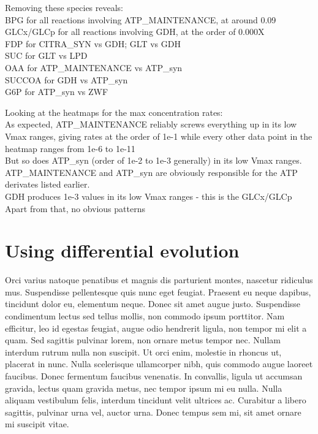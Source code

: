 \documentclass[parskip=full]{scrreprt}
\begin{document}
Removing these species reveals:\\
BPG for all reactions involving ATP\_MAINTENANCE, at around 0.09\\
GLCx/GLCp for all reactions involving GDH, at the order of 0.000X\\
FDP for CITRA\_SYN vs GDH; GLT vs GDH\\
SUC for GLT vs LPD\\
OAA for ATP\_MAINTENANCE vs ATP\_syn\\
SUCCOA for GDH vs ATP\_syn\\
G6P for ATP\_syn vs ZWF

Looking at the heatmaps for the max concentration rates:\\
As expected, ATP\_MAINTENANCE reliably screws everything up in its low Vmax ranges, giving rates at the order of 1e-1 while every other data point in the heatmap ranges from 1e-6 to 1e-11\\
But so does ATP\_syn (order of 1e-2 to 1e-3 generally) in its low Vmax ranges. ATP\_MAINTENANCE and ATP\_syn are obviously responsible for the ATP derivates listed earlier.\\
GDH produces 1e-3 values in its low Vmax ranges - this is the GLCx/GLCp\\
Apart from that, no obvious patterns

\section{Using differential evolution}
\label{sec:de}

Orci varius natoque penatibus et magnis dis parturient montes, nascetur ridiculus mus. Suspendisse pellentesque quis nunc eget feugiat. Praesent eu neque dapibus, tincidunt dolor eu, elementum neque. Donec sit amet augue justo. Suspendisse condimentum lectus sed tellus mollis, non commodo ipsum porttitor. Nam efficitur, leo id egestas feugiat, augue odio hendrerit ligula, non tempor mi elit a quam. Sed sagittis pulvinar lorem, non ornare metus tempor nec. Nullam interdum rutrum nulla non suscipit. Ut orci enim, molestie in rhoncus ut, placerat in nunc. Nulla scelerisque ullamcorper nibh, quis commodo augue laoreet faucibus. Donec fermentum faucibus venenatis. In convallis, ligula ut accumsan gravida, lectus quam gravida metus, nec tempor ipsum mi eu nulla. Nulla aliquam vestibulum felis, interdum tincidunt velit ultrices ac. Curabitur a libero sagittis, pulvinar urna vel, auctor urna. Donec tempus sem mi, sit amet ornare mi suscipit vitae.
\end{document}
